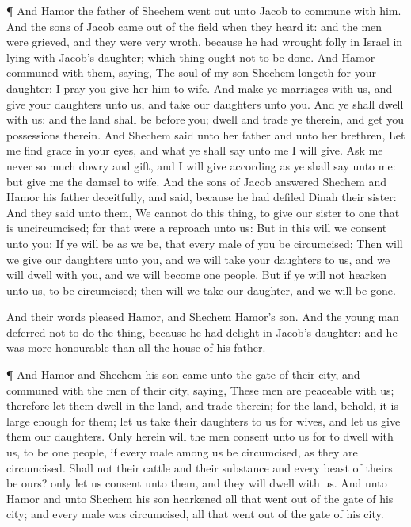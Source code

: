  ¶ And Hamor the father of Shechem went out unto Jacob to
commune with him.  And the sons of Jacob came out of the
field when they heard it: and the men were grieved, and they were very
wroth, because he had wrought folly in Israel in lying with Jacob's
daughter; which thing ought not to be done.  And Hamor
communed with them, saying, The soul of my son Shechem longeth for your
daughter: I pray you give her him to wife.  And make ye
marriages with us, and give your daughters unto us, and take our
daughters unto you.  And ye shall dwell with us: and the
land shall be before you; dwell and trade ye therein, and get you
possessions therein.  And Shechem said unto her father and
unto her brethren, Let me find grace in your eyes, and what ye shall say
unto me I will give.  Ask me never so much dowry and gift,
and I will give according as ye shall say unto me: but give me the
damsel to wife.  And the sons of Jacob answered Shechem and
Hamor his father deceitfully, and said, because he had defiled Dinah
their sister:  And they said unto them, We cannot do this
thing, to give our sister to one that is uncircumcised; for that were a
reproach unto us:  But in this will we consent unto you: If
ye will be as we be, that every male of you be circumcised;
 Then will we give our daughters unto you, and we will take
your daughters to us, and we will dwell with you, and we will become one
people.  But if ye will not hearken unto us, to be
circumcised; then will we take our daughter, and we will be gone.

 And their words pleased Hamor, and Shechem Hamor's son.
 And the young man deferred not to do the thing, because he
had delight in Jacob's daughter: and he was more honourable than all the
house of his father.

 ¶ And Hamor and Shechem his son came unto the gate of
their city, and communed with the men of their city, saying,
 These men are peaceable with us; therefore let them dwell
in the land, and trade therein; for the land, behold, it is large enough
for them; let us take their daughters to us for wives, and let us give
them our daughters.  Only herein will the men consent unto
us for to dwell with us, to be one people, if every male among us be
circumcised, as they are circumcised.  Shall not their
cattle and their substance and every beast of theirs be ours? only let
us consent unto them, and they will dwell with us.  And
unto Hamor and unto Shechem his son hearkened all that went out of the
gate of his city; and every male was circumcised, all that went out of
the gate of his city.

